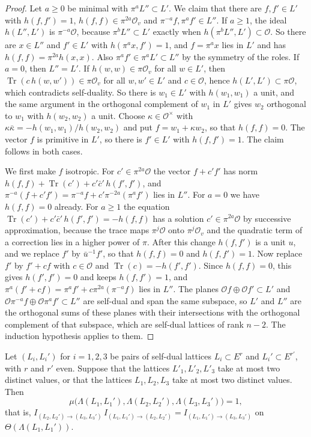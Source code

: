 \begin{proof}
Let $a\ge0$ be minimal with $\pi^aL''\subset L'$. We claim that there are $f,f'\in L'$ with $h(f,f')=1$, $h(f,f)\in\pi^{2a}\mathcal O_v$ and $\pi^{-a}f,\pi^af'\in L''$. If $a\ge1$, the ideal $h(L'',L')$ is $\pi^{-a}\mathcal O$, because $\pi^bL''\subset L'$ exactly when $h(\pi^bL'',L')\subset\mathcal O$. So there are $x\in L''$ and $f'\in L'$ with $h(\pi^ax,f')=1$, and $f=\pi^ax$ lies in $L'$ and has $h(f,f)=\pi^{2a}h(x,x)$. Also $\pi^af'\in\pi^aL'\subset L''$ by the symmetry of the roles. If $a=0$, then $L''=L'$. If $h(w,w)\in\pi\mathcal O_v$ for all $w\in L'$, then $\operatorname{Tr}(c\,h(w,w'))\in\pi\mathcal O_v$ for all $w,w'\in L'$ and $c\in\mathcal O$, hence $h(L',L')\subset\pi\mathcal O$, which contradicts self-duality. So there is $w_1\in L'$ with $h(w_1,w_1)$ a unit, and the same argument in the orthogonal complement of $w_1$ in $L'$ gives $w_2$ orthogonal to $w_1$ with $h(w_2,w_2)$ a unit. Choose $\kappa\in\mathcal O^\times$ with $\kappa\bar\kappa=-h(w_1,w_1)/h(w_2,w_2)$ and put $f=w_1+\kappa w_2$, so that $h(f,f)=0$. The vector $f$ is primitive in $L'$, so there is $f'\in L'$ with $h(f,f')=1$. The claim follows in both cases.

We first make $f$ isotropic. For $c'\in\pi^{2a}\mathcal O$ the vector $f+c'f'$ has norm $h(f,f)+\operatorname{Tr}(c')+c'\bar c'\,h(f',f')$, and $\pi^{-a}(f+c'f')=\pi^{-a}f+c'\pi^{-2a}(\pi^af')$ lies in $L''$. For $a=0$ we have $h(f,f)=0$ already. For $a\ge1$ the equation $\operatorname{Tr}(c')+c'\bar c'\,h(f',f')=-h(f,f)$ has a solution $c'\in\pi^{2a}\mathcal O$ by successive approximation, because the trace maps $\pi^j\mathcal O$ onto $\pi^j\mathcal O_v$ and the quadratic term of a correction lies in a higher power of $\pi$. After this change $h(f,f')$ is a unit $u$, and we replace $f'$ by $\bar u^{-1}f'$, so that $h(f,f)=0$ and $h(f,f')=1$. Now replace $f'$ by $f'+cf$ with $c\in\mathcal O$ and $\operatorname{Tr}(c)=-h(f',f')$. Since $h(f,f)=0$, this gives $h(f',f')=0$ and keeps $h(f,f')=1$, and $\pi^a(f'+cf)=\pi^af'+c\pi^{2a}(\pi^{-a}f)$ lies in $L''$. The planes $\mathcal Of\oplus\mathcal Of'\subset L'$ and $\mathcal O\pi^{-a}f\oplus\mathcal O\pi^af'\subset L''$ are self-dual and span the same subspace, so $L'$ and $L''$ are the orthogonal sums of these planes with their intersections with the orthogonal complement of that subspace, which are self-dual lattices of rank $n-2$. The induction hypothesis applies to them.
\end{proof}

\begin{lemma}\label{pathind}
Let $(L_i,L_i')$ for $i=1,2,3$ be pairs of self-dual lattices $L_i\subset E^r$ and $L_i'\subset E^{r'}$, with $r$ and $r'$ even. Suppose that the lattices $L'_1,L'_2,L'_3$ take at most two distinct values, or that the lattices $L_1,L_2,L_3$ take at most two distinct values. Then
\[
\mu\big(\Lambda(L_1,L_1'),\Lambda(L_2,L_2'),\Lambda(L_3,L_3')\big)=1,
\]
that is, $I_{(L_2,L_2')\to(L_3,L_3')}\,I_{(L_1,L_1')\to(L_2,L_2')}=I_{(L_1,L_1')\to(L_3,L_3')}$ on $\Theta(\Lambda(L_1,L_1'))$.
\end{lemma}

